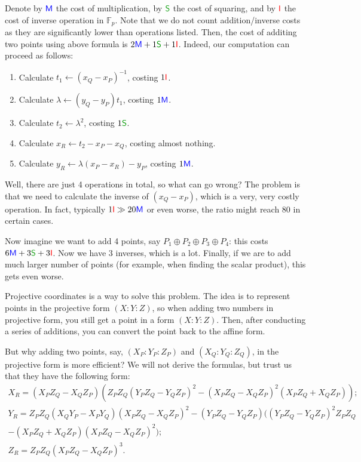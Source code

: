 \documentclass[../lecture-notes.tex]{subfiles}
\begin{document}
Denote by $\textcolor{blue}{\mathsf{M}}$ the cost of multiplication, by $\textcolor{green!60!black}{\mathsf{S}}$ the cost of squaring, and by $\textcolor{red}{\mathsf{I}}$ the cost of inverse operation in $\mathbb{F}_p$. Note that we do not count addition/inverse costs as they are significantly lower than operations listed. Then, the cost of additing two points using above formula is $2\textcolor{blue}{\mathsf{M}} + 1\textcolor{green!60!black}{\mathsf{S}} + 1\textcolor{red}{\mathsf{I}}$. Indeed, our computation can proceed as follows:
\begin{enumerate}
    \item Calculate $t_1 \gets (x_Q-x_P)^{-1}$, costing $1\textcolor{red}{\mathsf{I}}$.
    \item Calculate $\lambda \gets (y_Q-y_P)t_1$, costing $1\textcolor{blue}{\mathsf{M}}$.
    \item Calculate $t_2 \gets \lambda^2$, costing $1\textcolor{green!60!black}{\mathsf{S}}$.
    \item Calculate $x_R \gets t_2 - x_P - x_Q$, costing almost nothing.
    \item Calculate $y_R \gets \lambda (x_P-x_R) - y_P$, costing $1\textcolor{blue}{\mathsf{M}}$.
\end{enumerate}

Well, there are just 4 operations in total, so what can go wrong? The problem is that we need to calculate the inverse of $(x_Q-x_P)$, which is a very, very costly operation. In fact, typically $1\textcolor{red}{\mathsf{I}} \gg 20\textcolor{blue}{\mathsf{M}}$ or even worse, the ratio might reach $80$ in certain cases.

Now imagine we want to add 4 points, say $P_1 \oplus P_2 \oplus P_3 \oplus P_4$: this costs $6\textcolor{blue}{\mathsf{M}} + 3\textcolor{green!60!black}{\mathsf{S}} + 3\textcolor{red}{\mathsf{I}}$. Now we have 3 inverses, which is a lot. Finally, if we are to add much larger number of points (for example, when finding the scalar product), this gets even worse. 

Projective coordinates is a way to solve this problem. The idea is to represent points in the projective form $(X:Y:Z)$, so when adding two numbers in projective form, you still get a point in a form $(X:Y:Z)$. Then, after conducting a series of additions, you can convert the point back to the affine form. 

But why adding two points, say, $(X_P:Y_P:Z_P)$ and $(X_Q:Y_Q:Z_Q)$, in the projective form is more efficient? We will not derive the formulas, but trust us that they have the following form:
\begin{equation}
    \begin{aligned}
        X_R = (X_PZ_Q - X_QZ_P)(Z_PZ_Q(Y_PZ_Q-Y_QZ_P)^2 - (X_PZ_Q-X_QZ_P)^2(X_PZ_Q+X_QZ_P)); \\
        Y_R = Z_PZ_Q(X_QY_P - X_PY_Q)(X_PZ_Q-X_QZ_P)^2 - (Y_PZ_Q-Y_QZ_P)((Y_PZ_Q-Y_QZ_P)^2Z_PZ_Q\\-(X_PZ_Q+X_QZ_P)(X_PZ_Q-X_QZ_P)^2); \\
        Z_R = Z_PZ_Q(X_PZ_Q - X_QZ_P)^3.
    \end{aligned}
\end{equation}
\end{document}
